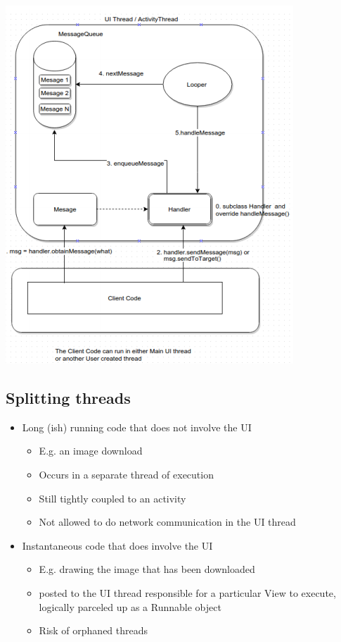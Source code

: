 \documentclass{article}
\begin{document}
\begin{multicols}{2}
\includegraphics[scale=0.7]{Screenshot_2018-10-22_14-04-33.png}

\end{multicols}

\subsection{Splitting threads}
\begin{itemize}
\item Long (ish) running code that does not involve the UI
\begin{itemize}
  \item E.g. an image download 
  \item Occurs in a separate thread of execution
  \item Still tightly coupled to an activity
  \item Not allowed to do network communication in the UI thread
\end{itemize}
\item Instantaneous code that does involve the UI
\begin{itemize}
  \item E.g. drawing the image that has been downloaded
  \item posted to the UI thread responsible for a particular View to execute, logically parceled up as a Runnable object
  \item Risk of orphaned threads
\end{itemize}
\end{itemize}
\end{document}
